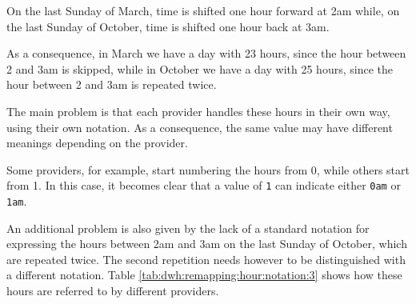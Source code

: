     On the last Sunday of March, time is shifted one hour forward at 2am while, on the last Sunday of October, time is shifted one hour back at 3am.
    
    As a consequence, in March we have a day with 23 hours, since the hour between 2 and 3am is skipped, while in October we have a day with 25 hours, since the hour between 2 and 3am is repeated twice.
    
    The main problem is that each provider handles these hours in their own way, using their own notation.
    As a consequence, the same value may have different meanings depending on the provider.
    
    Some providers, for example, start numbering the hours from 0, while others start from 1.
    In this case, it becomes clear that a value of \texttt{1} can indicate either \texttt{0am} or \texttt{1am}.
    
    An additional problem is also given by the lack of a standard notation for expressing the hours between 2am and 3am on the last Sunday of October, which are repeated twice.
    The second repetition needs however to be distinguished with a different notation.
    Table \ref{tab:dwh:remapping:hour:notation:3} shows how these hours are referred to by different providers.
    
